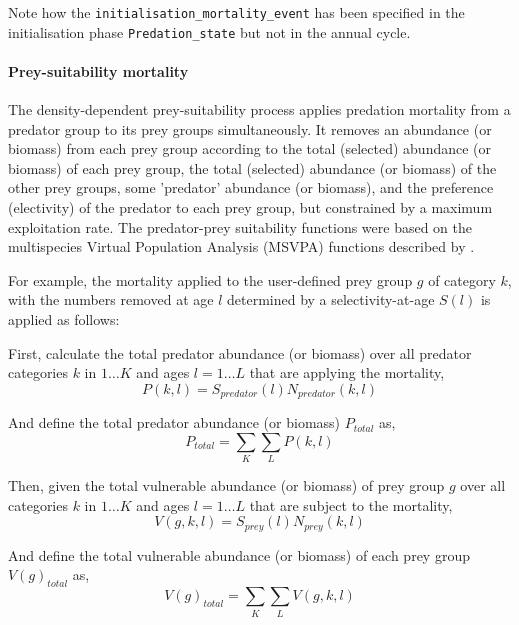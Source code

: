 Note how the \texttt{initialisation\_mortality\_event} has been specified in the initialisation phase \texttt{Predation\_state} but not in the annual cycle.

\paragraph{Prey-suitability mortality}

The density-dependent prey-suitability process applies predation mortality from a predator group to its prey groups simultaneously. It removes an abundance (or biomass) from each prey group according to the total (selected) abundance (or biomass) of each prey group, the total (selected) abundance (or biomass) of the other prey groups, some 'predator' abundance (or biomass), and the preference (electivity) of the predator to each prey group, but constrained by a maximum exploitation rate. The predator-prey suitability functions were based on the multispecies Virtual Population Analysis (MSVPA) functions described by \citep{JuradoMolina2005}.

For example, the mortality applied to the user-defined prey group $g$ of category $k$, with the numbers removed at age $l$ determined by a selectivity-at-age $S(l)$ is applied as follows:

First, calculate the total predator abundance (or biomass) over all predator categories $k$ in $1 \ldots K$ and ages $l = 1 \ldots L$ that are applying the mortality,
\begin{equation}
P(k,l) = S_{predator}(l) N_{predator}(k,l)
\end{equation}

And define the total predator abundance (or biomass) $P_{total}$ as,
\begin{equation}
P_{total}  = \sum\limits_K {\sum\limits_L {P(k,l)}} 
\end{equation}

Then, given the total vulnerable abundance (or biomass) of prey group $g$ over all categories $k$ in $1 \ldots K$ and ages $l = 1 \ldots L$ that are subject to the mortality,
\begin{equation}
V(g,k,l) = S_{prey}(l) N_{prey}(k,l)
\end{equation}

And define the total vulnerable abundance (or biomass) of each prey group $V(g)_{total}$ as,
\begin{equation}
V(g)_{total}  = \sum\limits_K {\sum\limits_L {V(g,k,l)}} 
\end{equation}

